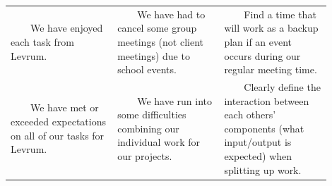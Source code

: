 \documentclass[onecolumn, draftclsnofoot,10pt, compsoc]{IEEEtran}
\newcommand{\tabitem}{~~\llap{\textbullet}~~}
\begin{document}
\begin{singlespace}
\begin{center}
\begin{singlespace}
\begin{tabular}{ |p{0.3\linewidth}|p{0.3\linewidth}|p{0.3\linewidth}| }
        \tabitem We have enjoyed each task from Levrum. 
         &%
         \tabitem We have had to cancel some group meetings (not client meetings) due to school events.
         &%
         \tabitem Find a time that will work as a backup plan if an event occurs during our regular meeting time.
         \\
         
         \tabitem We have met or exceeded expectations on all of our tasks for Levrum.
         &%
         \tabitem We have run into some difficulties combining our individual work for our projects.
         &%
         \tabitem Clearly define the interaction between each others' components (what input/output is expected) when splitting up work.
         \\ 
         
        \hline
        \end{tabular}
        \end{singlespace}
        \end{center}

\end{singlespace}
%
\end{document}
